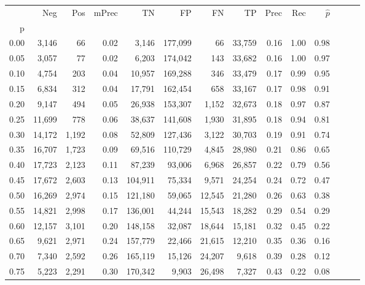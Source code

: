\begin{tabular}{rrrrrrrrrrrrrr}
\toprule
{} &     Neg &    Pos & mPrec &       TN &       FP &      FN &      TP &  Prec &   Rec & $\hat{p}$ \\
p    &         &        &       &          &          &         &         &       &       &           \\
\midrule
0.00 &   3,146 &     66 &  0.02 &    3,146 &  177,099 &      66 &  33,759 &  0.16 &  1.00 &      0.98 \\
0.05 &   3,057 &     77 &  0.02 &    6,203 &  174,042 &     143 &  33,682 &  0.16 &  1.00 &      0.97 \\
0.10 &   4,754 &    203 &  0.04 &   10,957 &  169,288 &     346 &  33,479 &  0.17 &  0.99 &      0.95 \\
0.15 &   6,834 &    312 &  0.04 &   17,791 &  162,454 &     658 &  33,167 &  0.17 &  0.98 &      0.91 \\
0.20 &   9,147 &    494 &  0.05 &   26,938 &  153,307 &   1,152 &  32,673 &  0.18 &  0.97 &      0.87 \\
0.25 &  11,699 &    778 &  0.06 &   38,637 &  141,608 &   1,930 &  31,895 &  0.18 &  0.94 &      0.81 \\
0.30 &  14,172 &  1,192 &  0.08 &   52,809 &  127,436 &   3,122 &  30,703 &  0.19 &  0.91 &      0.74 \\
0.35 &  16,707 &  1,723 &  0.09 &   69,516 &  110,729 &   4,845 &  28,980 &  0.21 &  0.86 &      0.65 \\
0.40 &  17,723 &  2,123 &  0.11 &   87,239 &   93,006 &   6,968 &  26,857 &  0.22 &  0.79 &      0.56 \\
0.45 &  17,672 &  2,603 &  0.13 &  104,911 &   75,334 &   9,571 &  24,254 &  0.24 &  0.72 &      0.47 \\
0.50 &  16,269 &  2,974 &  0.15 &  121,180 &   59,065 &  12,545 &  21,280 &  0.26 &  0.63 &      0.38 \\
0.55 &  14,821 &  2,998 &  0.17 &  136,001 &   44,244 &  15,543 &  18,282 &  0.29 &  0.54 &      0.29 \\
0.60 &  12,157 &  3,101 &  0.20 &  148,158 &   32,087 &  18,644 &  15,181 &  0.32 &  0.45 &      0.22 \\
0.65 &   9,621 &  2,971 &  0.24 &  157,779 &   22,466 &  21,615 &  12,210 &  0.35 &  0.36 &      0.16 \\
0.70 &   7,340 &  2,592 &  0.26 &  165,119 &   15,126 &  24,207 &   9,618 &  0.39 &  0.28 &      0.12 \\
0.75 &   5,223 &  2,291 &  0.30 &  170,342 &    9,903 &  26,498 &   7,327 &  0.43 &  0.22 &      0.08 \\

\end{tabular}
